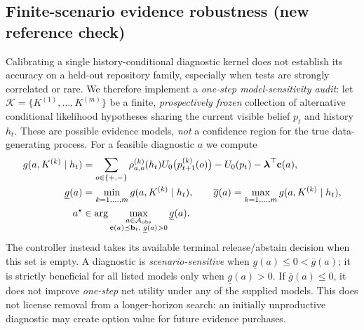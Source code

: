 \documentclass[pdflatex,sn-basic]{sn-jnl}
\begin{document}
\subsection{Finite-scenario evidence robustness (new reference check)}
\label{sec:robust-evidence}

Calibrating a single history-conditional diagnostic kernel does
not establish its accuracy on a held-out repository family,
especially when tests are strongly correlated or rare.
We therefore implement a \emph{one-step model-sensitivity audit}:
let $\mathcal K=\{K^{(1)},\dots,K^{(m)}\}$ be a finite,
\emph{prospectively frozen} collection of alternative conditional
likelihood hypotheses sharing the current visible belief $p_t$
and history $h_t$. These are possible evidence models,
\emph{not} a confidence region for the true data-generating process.
For a feasible diagnostic $a$ we compute
\begin{align}
 g(a,K^{(k)}\mid h_t)
 &=\sum_{o\in\{+,-\}}\rho^{(k)}_{a,o}(h_t)
 U_0\bigl(p^{(k)}_{t+1}(o)\bigr)
 -U_0(p_t)-\boldsymbol\lambda^\top\mathbf c(a),
 \label{eq:robust-gain}\\
 \underline g(a)&=\min_{k=1,\dots,m}
      g(a,K^{(k)}\mid h_t), \qquad
 \overline g(a)=\max_{k=1,\dots,m}
      g(a,K^{(k)}\mid h_t),
 \label{eq:robust-bounds}\\
 a^\star&\in\arg\max_{\substack{
    a\in\mathcal A_{\rm obs}\\
    \mathbf c(a)\preceq\mathbf b_t,\;
    \underline g(a)>0}}\underline g(a).
 \label{eq:robust-probe}
\end{align}
The controller instead takes its available terminal
release/abstain decision when this set is empty.
A diagnostic is \emph{scenario-sensitive} when
$\underline g(a)\le0<\overline g(a)$; it is strictly
beneficial for all listed models only when
$\underline g(a)>0$. If $\overline g(a)\le0$, it
does not improve \emph{one-step} net utility
under any of the supplied models. This does
not license removal from a longer-horizon search:
an initially unproductive diagnostic may create
option value for future evidence purchases.
\end{document}
